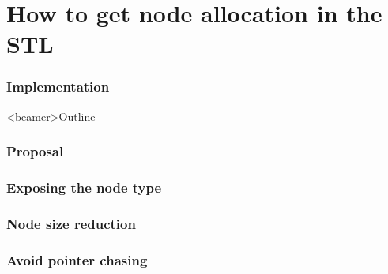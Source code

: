 \documentclass[10pt,aspectratio=169]{beamer}
\def\nodeU{\node[style=nodeU]}
\def\nodeD{\node[style=nodeD]}
\def\nodeQ{\node[style=nodeQ]}
\def\nodeO{\node[style=nodeO]}
\def\valueU{\node[style=valueU]}
\def\valueD{\node[style=valueD]}
\def\valueQ{\node[style=valueQ]}
\def\valueO{\node[style=valueO]}
\begin{document}
%
%
%
%
%
%

\part{How to get node allocation in the STL}

\section[Implementation]{Implementation}
\begin{frame}<beamer>{Outline}
\end{frame}

\section[Proposal]{Proposal}
\section[Exposing the node type]{Exposing the node type}
\section[Node size reduction]{Node size reduction}
\section[Avoid pointer chasing]{Avoid pointer chasing}
\end{document}

